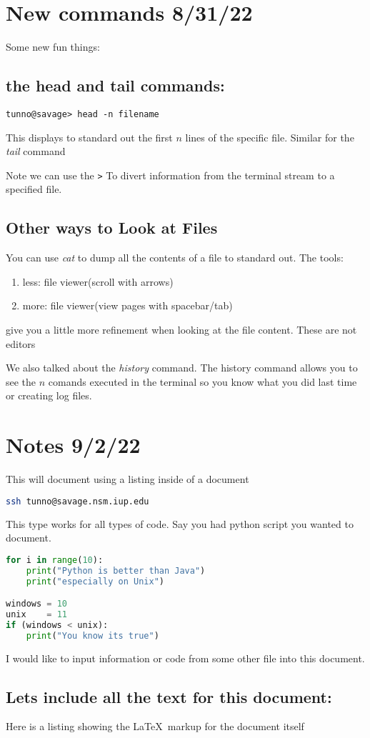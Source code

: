 \documentclass[12pt]{article}
\begin{document}
\section{New commands 8/31/22}
Some new fun things:
\subsection{the {\bf head} and {\bf tail} commands:} 
\begin{verbatim}
tunno@savage> head -n filename
\end{verbatim}
This displays to standard out the first  $n$ lines of the specific file. Similar for the {\it tail} command

Note we can use the  \verb'>' %
To divert information from the terminal stream to a specified file.

\subsection*{Other ways to Look at Files}
You can use {\it cat} to dump all the contents of a file to standard out. The tools:
\begin{enumerate}
\item less: file viewer(scroll with arrows)
\item more: file viewer(view pages with spacebar/tab)
\end{enumerate}
give you a little more refinement when looking at the file content. These are not editors

We also talked about the {\it history} command. The history command allows you to see the $n$ comands executed in the terminal so you know what you did
 last time or creating log files.


\section*{Notes 9/2/22}
This will document using a listing inside of a document
\begin{lstlisting}[language=bash]
ssh tunno@savage.nsm.iup.edu
\end{lstlisting}
This type works for all types of code. Say you had python script you wanted to document.
\begin{lstlisting}[language=python, caption=Basic python script"]
for i in range(10):
	print("Python is better than Java")
	print("especially on Unix")

windows = 10
unix    = 11
if (windows < unix):
	print("You know its true")
\end{lstlisting}

I would like to input information or code from some other file into this document.



\subsection*{Lets include all the text for this document:}
Here is a listing showing the \LaTeX\ markup for the document itself

\end{document}

